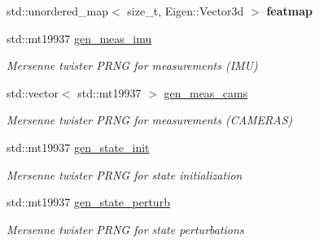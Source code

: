 \begin{DoxyCompactItemize}
\mbox{\label{classov__init_1_1SimulatorInit_a26cfaf9b3d02ad742eb1dabc40eaab32}} 
std\+::unordered\+\_\+map$<$ size\+\_\+t, Eigen\+::\+Vector3d $>$ {\bfseries featmap}
\item 
\mbox{\label{classov__init_1_1SimulatorInit_a07a8dcfb65652705d79ccade133cfac5}} 
std\+::mt19937 \hyperlink{classov__init_1_1SimulatorInit_a07a8dcfb65652705d79ccade133cfac5}{gen\+\_\+meas\+\_\+imu}
\begin{DoxyCompactList}\small\item\em Mersenne twister P\+R\+NG for measurements (I\+MU) \end{DoxyCompactList}\item 
\mbox{\label{classov__init_1_1SimulatorInit_a22c0c57b4ddbd9995b42020e1139e3ea}} 
std\+::vector$<$ std\+::mt19937 $>$ \hyperlink{classov__init_1_1SimulatorInit_a22c0c57b4ddbd9995b42020e1139e3ea}{gen\+\_\+meas\+\_\+cams}
\begin{DoxyCompactList}\small\item\em Mersenne twister P\+R\+NG for measurements (C\+A\+M\+E\+R\+AS) \end{DoxyCompactList}\item 
\mbox{\label{classov__init_1_1SimulatorInit_ad458e97f0d879d4b23fe983dec5df804}} 
std\+::mt19937 \hyperlink{classov__init_1_1SimulatorInit_ad458e97f0d879d4b23fe983dec5df804}{gen\+\_\+state\+\_\+init}
\begin{DoxyCompactList}\small\item\em Mersenne twister P\+R\+NG for state initialization \end{DoxyCompactList}\item 
\mbox{\label{classov__init_1_1SimulatorInit_ad1183d2053b6618e3ad4f4b3616c74a6}} 
std\+::mt19937 \hyperlink{classov__init_1_1SimulatorInit_ad1183d2053b6618e3ad4f4b3616c74a6}{gen\+\_\+state\+\_\+perturb}
\begin{DoxyCompactList}\small\item\em Mersenne twister P\+R\+NG for state perturbations \end{DoxyCompactList}\item 
\mbox{\label{classov__init_1_1SimulatorInit_a8abb917e0f329e5d8602692a5f4c2776}} 

\end{DoxyCompactItemize}
